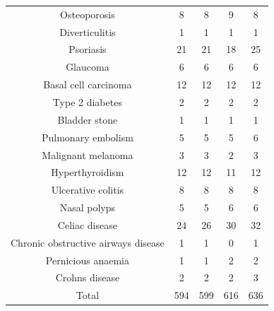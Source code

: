 \begin{footnotesize}
\begin{longtable}[h!]{|c|c|c|c|c|}
 Osteoporosis  & 8 & 8 & 9 & 8 \\
 Diverticulitis  & 1 & 1 & 1 & 1 \\
 Psoriasis  & 21 & 21 & 18 & 25 \\
 Glaucoma  & 6 & 6 & 6 & 6 \\
 Basal cell carcinoma  & 12 & 12 & 12 & 12 \\
 Type 2 diabetes  & 2 & 2 & 2 & 2 \\
 Bladder stone  & 1 & 1 & 1 & 1 \\
 Pulmonary embolism  & 5 & 5 & 5 & 6 \\
 Malignant melanoma  & 3 & 3 & 2 & 3 \\
 Hyperthyroidism  & 12 & 12 & 11 & 12 \\
 Ulcerative colitis  & 8 & 8 & 8 & 8 \\
 Nasal polyps  & 5 & 5 & 6 & 6 \\
 Celiac disease  & 24 & 26 & 30 & 32 \\
 Chronic obstructive airways disease  & 1 & 1 & 0 & 1 \\
 Pernicious anaemia  & 1 & 1 & 2 & 2  \\
 Crohns disease  & 2 & 2 & 2 & 3 \\
\hline
 Total & 594 & 599 & 616 & 636
\label{tab:loci_bt}
\end{longtable}
\end{footnotesize}

